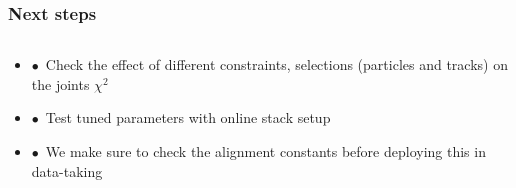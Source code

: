 \documentclass[aspectratio=1610, 12pt]{beamer}
\begin{document}
\begin{frame}\frametitle{Next steps}
  \begin{columns}
    \begin{column}[c]{0.90\textwidth}
      \begin{itemize}
        \item $\bullet$\, Check the effect of different constraints, selections (particles and tracks) on the joints $\chi^2$
        \item $\bullet$\, Test tuned parameters with online stack setup
        \item $\bullet$\, We make sure to check the alignment constants before deploying this in data-taking
      \end{itemize}
    \end{column}
  \end{columns}
\end{frame}
\end{document}
